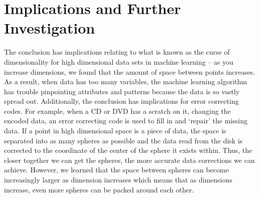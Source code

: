 \section{Implications and Further Investigation} 
The conclusion has implications relating to what is known as the curse of dimensionality for high dimensional data sets in machine learning -- as you increase dimensions, we found that the amount of space between points increases. As a result, when data has too many variables, the machine learning algorithm has trouble pinpointing attributes and patterns because the data is so vastly spread out. Additionally, the conclusion has implications for error correcting codes. For example, when a CD or DVD has a scratch on it, changing the encoded data, an error correcting code is used to fill in and `repair' the missing data. If a point in high dimensional space is a piece of data, the space is separated into as many spheres as possible and the data read from the disk is corrected to the coordinate of the center of the sphere it exists within. Thus, the closer together we can get the spheres, the more accurate data corrections we can achieve. However, we learned that the space between spheres can become increasingly larger as dimension increases which means that as dimensions increase, even more spheres can be packed around each other.